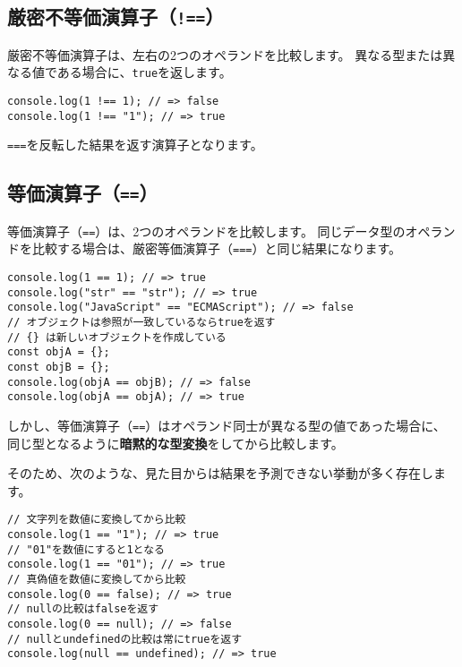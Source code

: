 \hypertarget{strict-not-equal-operator}{%
\subsection{\texorpdfstring{厳密不等価演算子（\texttt{!==}）}{厳密不等価演算子（!==）}}\label{strict-not-equal-operator}}

厳密不等価演算子は、左右の2つのオペランドを比較します。
異なる型または異なる値である場合に、\texttt{true}を返します。

\begin{lstlisting}
console.log(1 !== 1); // => false
console.log(1 !== "1"); // => true
\end{lstlisting}

\texttt{===}を反転した結果を返す演算子となります。

\hypertarget{equal-operator}{%
\subsection{\texorpdfstring{等価演算子（\texttt{==}）}{等価演算子（==）}}\label{equal-operator}}

等価演算子（\texttt{==}）は、2つのオペランドを比較します。
同じデータ型のオペランドを比較する場合は、厳密等価演算子（\texttt{===}）と同じ結果になります。

\begin{lstlisting}
console.log(1 == 1); // => true
console.log("str" == "str"); // => true
console.log("JavaScript" == "ECMAScript"); // => false
// オブジェクトは参照が一致しているならtrueを返す
// {} は新しいオブジェクトを作成している
const objA = {};
const objB = {};
console.log(objA == objB); // => false
console.log(objA == objA); // => true
\end{lstlisting}

しかし、等価演算子（\texttt{==}）はオペランド同士が異なる型の値であった場合に、
同じ型となるように\textbf{暗黙的な型変換}をしてから比較します。

そのため、次のような、見た目からは結果を予測できない挙動が多く存在します。

\begin{lstlisting}
// 文字列を数値に変換してから比較
console.log(1 == "1"); // => true
// "01"を数値にすると1となる
console.log(1 == "01"); // => true
// 真偽値を数値に変換してから比較
console.log(0 == false); // => true
// nullの比較はfalseを返す
console.log(0 == null); // => false
// nullとundefinedの比較は常にtrueを返す
console.log(null == undefined); // => true
\end{lstlisting}

